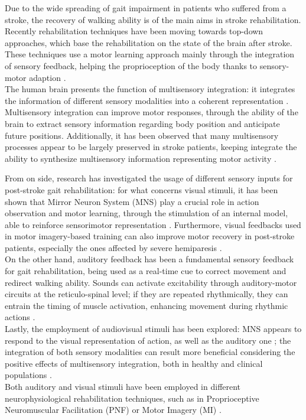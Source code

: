 Due to the wide spreading of gait impairment in patients who suffered from a stroke, the recovery of walking ability is of the main aims in stroke rehabilitation. Recently rehabilitation techniques have been moving towards top-down approaches, which base the rehabilitation on the state of the brain after stroke. These techniques use a motor learning approach mainly through the integration of sensory feedback, helping the proprioception of the body thanks to sensory-motor adaption \parencite{Belda-Lois_2011}. \\
The human brain presents the function of multisensory integration: it integrates the information of different sensory modalities into a coherent representation \parencite{Stein_2008}. Multisensory integration can improve motor responses, through the ability of the brain to extract sensory information regarding body position and anticipate future positions. Additionally, it has been observed that many multisensory processes appear to be largely preserved in stroke patients, keeping integrate the ability to synthesize multisensory information representing motor activity \parencite{Bolognini_2013}.

From on side, research has investigated the usage of different sensory inputs for post-stroke gait rehabilitation: for what concerns visual stimuli, it has been shown that Mirror Neuron System (MNS) play a crucial role in action observation and motor learning, through the stimulation of an internal model, able to reinforce sensorimotor representation \parencite{Rizzolati_2004}. Furthermore, visual feedbacks used in motor imagery-based training can also improve motor recovery in post-stroke patients, especially the ones affected by severe hemiparesis \parencite{Mihara_2013}. \\
On the other hand, auditory feedback has been a fundamental sensory feedback for gait rehabilitation, being used as a real-time cue to correct movement and redirect walking ability. Sounds can activate excitability through auditory-motor circuits at the reticulo-spinal level; if they are repeated rhythmically, they can entrain the timing of muscle activation, enhancing movement during rhythmic actions \parencite{Thaut_1999}. \\
Lastly, the employment of audiovisual stimuli has been explored: MNS appears to respond to the visual representation of action, as well as the auditory one \parencite{Rizzolati_2004}; the integration of both sensory modalities can result more beneficial considering the positive effects of multisensory integration, both in healthy and clinical populations \parencite{Bolognini_2015}. \\
Both auditory and visual stimuli have been employed in different neurophysiological rehabilitation techniques, such as in Proprioceptive Neuromuscular Facilitation (PNF) \parencite{Moros_2000} or Motor Imagery (MI) \parencite{Mason_2007}. 

